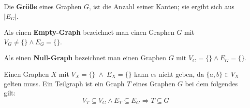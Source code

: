 \begin{definition}
    Die \textbf{Größe} eines Graphen $G$, ist die Anzahl seiner Kanten; sie ergibt sich aus $|E_G|$.
\end{definition}
\begin{definition}
    Als einen \textbf{Empty-Graph} bezeichnet man einen Graphen $G$ mit $V_G \neq \{\} \wedge E_G=\{\}$.\\
\end{definition}
\begin{definition}
     Als einen \textbf{Null-Graph} bezeichnet man einen Graphen $G$ mit $V_G=\{\} \wedge E_G=\{\}$.
\end{definition}
Einen Graphen $X$ mit $V_X = \{\} \; \wedge \; E_X =\{\}$ kann es nicht geben, da $\{a,b\} \in V_X$ gelten muss.
\newpage
Ein Teilgraph ist ein Graph $T$ eines Graphen $G$ bei dem folgendes gilt:
$$V_T \subseteq V_G \wedge E_T \subseteq E_G \Rightarrow T \subseteq G$$